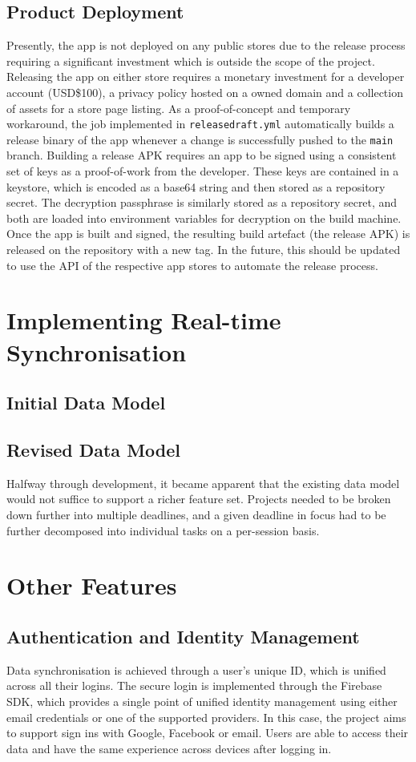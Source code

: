 \subsection{Product Deployment}
Presently, the app is not deployed on any public stores due to the release process requiring a significant investment which is outside the scope of the project. Releasing the app on either store requires a monetary investment for a developer account (USD\$100), a privacy policy hosted on a owned domain and a collection of assets for a store page listing. As a proof-of-concept and temporary workaround, the job implemented in \texttt{releasedraft.yml} automatically builds a release binary of the app whenever a change is successfully pushed to the \texttt{main} branch.
Building a release APK requires an app to be signed using a consistent set of keys as a proof-of-work from the developer. These keys are contained in a keystore, which is encoded as a base64 string and then stored as a repository secret. The decryption passphrase is similarly stored as a repository secret, and both are loaded into environment variables for decryption on the build machine. Once the app is built and signed, the resulting build artefact (the release APK) is released on the repository with a new tag. In the future, this should be updated to use the API of the respective app stores to automate the release process.

\section{Implementing Real-time Synchronisation}
\subsection{Initial Data Model}
\subsection{Revised Data Model}
Halfway through development, it became apparent that the existing data model would not suffice to support a richer feature set. Projects needed to be broken down further into multiple deadlines, and a given deadline in focus had to be further decomposed into individual tasks on a per-session basis.


\section{Other Features}
\subsection{Authentication and Identity Management}
Data synchronisation is achieved through a user's unique ID, which is unified across all their logins. The secure login is implemented through the Firebase SDK, which provides a single point of unified identity management using either email credentials or one of the supported providers. In this case, the project aims to support sign ins with Google, Facebook or email. Users are able to access their data and have the same experience across devices after logging in.


